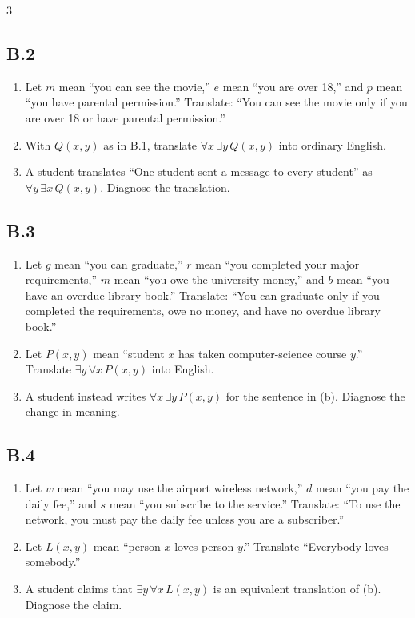 \documentclass{article}
\newcommand{\problem}[1]{%
  \par
  \subsection*{#1}%
}
\begin{document}
\begin{multicols}{3}
\columnbreak
\problem{B.2}
\begin{enumerate}[label=(\alph*)]
  \item Let $m$ mean ``you can see the movie,'' $e$ mean ``you are over 18,''
        and $p$ mean ``you have parental permission.'' Translate: ``You can
        see the movie only if you are over 18 or have parental permission.''
  \item With $Q(x,y)$ as in B.1, translate $\forall x\,\exists y\,Q(x,y)$
        into ordinary English.
  \item A student translates ``One student sent a message to every student''
        as $\forall y\,\exists x\,Q(x,y)$. Diagnose the translation.
\end{enumerate}

\problem{B.3}
\begin{enumerate}[label=(\alph*)]
  \item Let $g$ mean ``you can graduate,'' $r$ mean ``you completed your major
        requirements,'' $m$ mean ``you owe the university money,'' and $b$
        mean ``you have an overdue library book.'' Translate: ``You can
        graduate only if you completed the requirements, owe no money, and
        have no overdue library book.''
  \item Let $P(x,y)$ mean ``student $x$ has taken computer-science course
        $y$.'' Translate $\exists y\,\forall x\,P(x,y)$ into English.
  \item A student instead writes $\forall x\,\exists y\,P(x,y)$ for the
        sentence in (b). Diagnose the change in meaning.
\end{enumerate}

\columnbreak
\problem{B.4}
\begin{enumerate}[label=(\alph*)]
  \item Let $w$ mean ``you may use the airport wireless network,'' $d$ mean
        ``you pay the daily fee,'' and $s$ mean ``you subscribe to the
        service.'' Translate: ``To use the network, you must pay the daily fee
        unless you are a subscriber.''
  \item Let $L(x,y)$ mean ``person $x$ loves person $y$.'' Translate
        ``Everybody loves somebody.''
  \item A student claims that $\exists y\,\forall x\,L(x,y)$ is an equivalent
        translation of (b). Diagnose the claim.
\end{enumerate}


\end{multicols}
\end{document}
